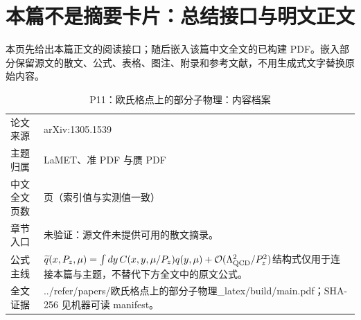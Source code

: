 \documentclass[UTF8,11pt,oneside]{ctexbook}
\begin{document}
\section*{本篇不是摘要卡片：总结接口与明文正文}
本页先给出本篇正文的阅读接口；随后嵌入该篇中文全文的已构建 PDF。嵌入部分保留源文的散文、公式、表格、图注、附录和参考文献，不用生成式文字替换原始内容。
\begin{table}[htbp]
  \centering
  \caption{P11：欧氏格点上的部分子物理：内容档案}
  \small
  \begin{tabularx}{0.96\textwidth}{@{}p{3.3cm}>{\raggedright\arraybackslash}X@{}}
    \toprule
    论文来源 & arXiv:1305.1539 \\
    主题归属 & LaMET、准 PDF 与赝 PDF \\
    中文全文页数 & 6 页（索引值与实测值一致） \\
    章节入口 & 未验证：源文件未提供可用的散文摘录。 \\
    公式主线 & $\widetilde q(x,P_z,\mu)=\int dy\,C(x,y,\mu/P_z)q(y,\mu)+\mathcal O(\Lambda_{\rm QCD}^{2}/P_z^{2})$\newline\scriptsize 结构式仅用于连接本篇与主题，不替代下方全文中的原文公式。 \\
    全文证据 & ../\allowbreak{}refer/\allowbreak{}papers/\allowbreak{}欧氏格点上的部分子物理\_\allowbreak{}latex/\allowbreak{}build/\allowbreak{}main.pdf；SHA-256 见机器可读 manifest。 \\
    \bottomrule
  \end{tabularx}
\end{table}
\end{document}
